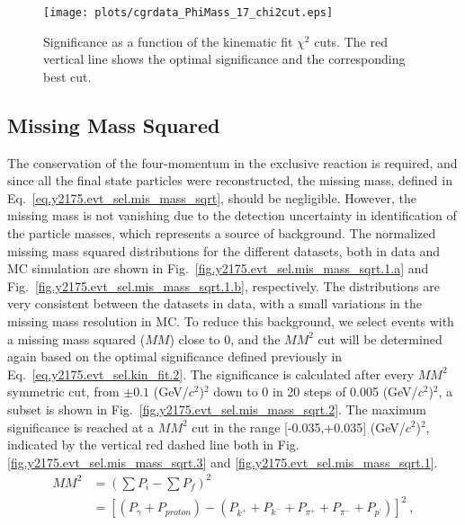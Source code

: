 \begin{figure}[H]
    \centering
        \texttt{[image: plots/cgrdata\_PhiMass\_17\_chi2cut.eps]}
        \caption{Significance as a function of the kinematic fit $\chi^{2}$ cuts. The red vertical line shows the optimal significance and the corresponding best cut.}
        \label{fig.y2175.evt_sel.kin_fit.3}
\end{figure}

\subsection{Missing Mass Squared}
\label{chap.y2175.evt_sel.mis_mass_sqrt}

The conservation of the four-momentum in the exclusive reaction is required, and since all the final state particles were reconstructed, the missing mass, defined in Eq.~\ref{eq.y2175.evt_sel.mis_mass_sqrt}, should be negligible. However, the missing mass is not vanishing due to the detection uncertainty in identification of the particle masses, which represents a source of background. The normalized missing mass squared distributions for the different datasets, both in data and MC simulation are shown in Fig.~\ref{fig.y2175.evt_sel.mis_mass_sqrt.1.a} and Fig.~\ref{fig.y2175.evt_sel.mis_mass_sqrt.1.b}, respectively. The distributions are very consistent between the datasets in data, with a small variations in the missing mass resolution in MC. To reduce this background, we select events with a missing mass squared ($MM$) close to 0, and the $MM^{2}$ cut will be determined again based on the optimal significance defined previously in Eq.~\ref{eq.y2175.evt_sel.kin_fit.2}. The significance is calculated after every $MM^{2}$ symmetric cut, from $\pm 0.1$ (GeV/$c^2$)$^2$ down to 0 in 20 steps of 0.005 (GeV/$c^2$)$^2$, a subset is shown in Fig.~\ref{fig.y2175.evt_sel.mis_mass_sqrt.2}. The maximum significance is reached at a $MM^{2}$ cut in the range [-0.035,+0.035] (GeV/$c^2$)$^2$, indicated by the vertical red dashed line both in Fig.\ref{fig.y2175.evt_sel.mis_mass_sqrt.3} and \ref{fig.y2175.evt_sel.mis_mass_sqrt.1}.
\begin{equation}
    \label{eq.y2175.evt_sel.mis_mass_sqrt}
    \begin{aligned}
        MM^2 &= \left(\sum P_{i} - \sum P_{f}\right)^2 \\
             &= [(P_{\gamma} + P_{proton}) - (P_{k^+} + P_{k^-} + P_{\pi^+} + P_{\pi^-} + P_{p^{\prime}})]^2~,
    \end{aligned}    
\end{equation}

